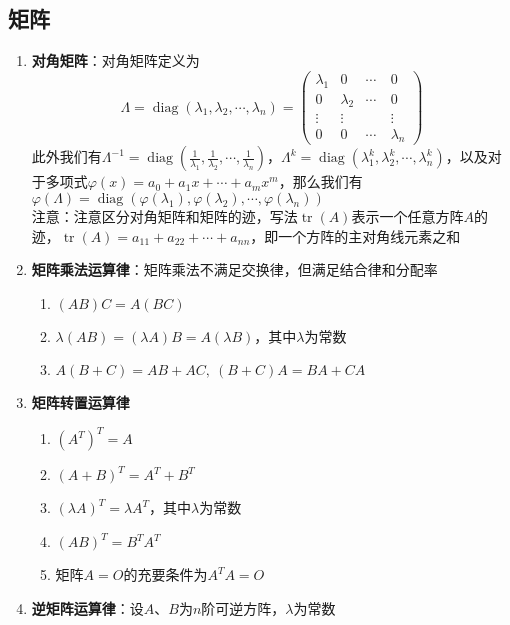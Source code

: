 \documentclass[12pt,a4paper,UTF8]{book}
\begin{document}
\subsection{矩阵}
\begin{enumerate}
\item \textbf{对角矩阵}：对角矩阵定义为
\[\Lambda=\operatorname{diag}\left(\lambda_1,\lambda_2,\cdots,\lambda_n\right)=\begin{pmatrix}\lambda_1&0&\cdots&0\\0&\lambda_2&\cdots&0\\\vdots&\vdots&\quad&\vdots\\0&0&\cdots&\lambda_n\end{pmatrix}\]
此外我们有$\Lambda^{-1}=\operatorname{diag}\left(\frac{1}{\lambda_1},\frac{1}{\lambda_2},\cdots,\frac{1}{\lambda_n}\right)$，$\Lambda^k=\operatorname{diag}\left(\lambda_1^k,\lambda_2^k,\cdots,\lambda_n^k\right)$，以及对于多项式$\varphi\left(x\right)=a_0+a_1x+\cdots+a_mx^m$，那么我们有$\varphi\left(\Lambda\right)=\operatorname{diag}\left(\varphi\left(\lambda_1\right),\varphi\left(\lambda_2\right),\cdots,\varphi\left(\lambda_n\right)\right)$\\
注意：注意区分对角矩阵和矩阵的迹，写法$\operatorname{tr}\left(A\right)$表示一个任意方阵$A$的迹，$\operatorname{tr}\left(A\right)=a_{11}+a_{22}+\cdots+a_{nn}$，即一个方阵的主对角线元素之和
\item \textbf{矩阵乘法运算律}：矩阵乘法不满足交换律，但满足结合律和分配率
\begin{enumerate}
\item $\left(AB\right)C=A\left(BC\right)$
\item $\lambda\left(AB\right)=\left(\lambda A\right)B=A\left(\lambda B\right)$，其中$\lambda$为常数
\item $A\left(B+C\right)=AB+AC,\ \left(B+C\right)A=BA+CA$
\end{enumerate}
\item \textbf{矩阵转置运算律}
\begin{enumerate}
\item $\left(A^T\right)^T=A$
\item $\left(A+B\right)^T=A^T+B^T$
\item $\left(\lambda A\right)^T=\lambda A^T$，其中$\lambda$为常数
\item $\left(AB\right)^T=B^TA^T$
\item 矩阵$A=O$的充要条件为$A^TA=O$
\end{enumerate}
\item \textbf{逆矩阵运算律}：设$A$、$B$为$n$阶可逆方阵，$\lambda$为常数

\end{enumerate}
\end{document}
